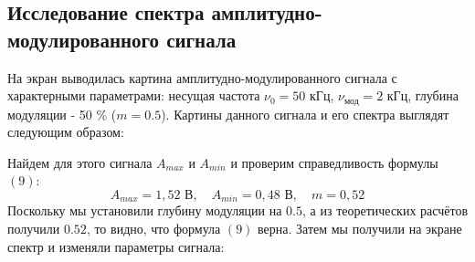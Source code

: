\subsection*{Исследование спектра амплитудно-модулированного сигнала}
На экран выводилась картина амплитудно-модулированного сигнала с характерными параметрами: несущая частота $\nu_0 = 50$ кГц, $\nu_{\text{мод}} = 2$ кГц, глубина модуляции - 50 \% ($m = 0.5$). Картины данного сигнала и его спектра выглядят следующим образом:
\begin{figure}[H]
\centering
\end{figure}
\n
Найдем для этого сигнала $A_{max}$ и $A_{min}$ и проверим справедливость формулы $(9)$:
\[A_{max} = 1,52 \text{ В}, \quad A_{min} = 0,48 \text{ В}, \quad m = 0,52\]
\n
Поскольку мы установили глубину модуляции на $0.5$, а из теоретических расчётов получили $0.52$, то видно, что формула $(9)$ верна.
\n\n
Затем мы получили на экране спектр и изменяли параметры сигнала:
\begin{figure}[H]
    \centering
    \\
    \end{figure}
